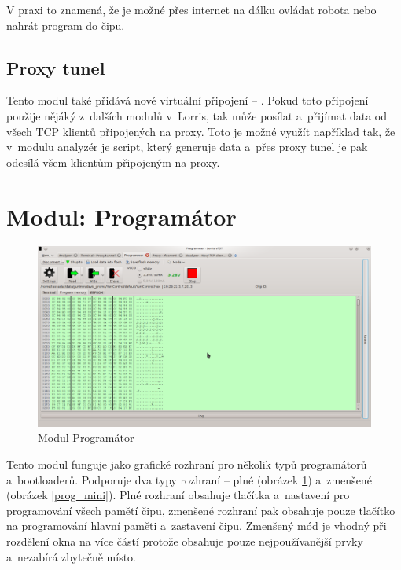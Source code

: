 \documentclass[12pt, a4paper, oneside]{article}
\begin{document}
V praxi to znamená, že je možné přes internet na dálku ovládat robota nebo nahrát program do čipu.

\subsection{Proxy tunel}
Tento modul také přidává nové virtuální připojení -- . Pokud toto připojení použije nějáký z~dalších modulů v~Lorris, tak může posílat a~přijímat data od všech TCP klientů připojených na proxy. Toto je možné využít například tak, že v~modulu analyzér je script, který generuje data a~přes proxy tunel je pak odesílá všem klientům připojeným na proxy.

\newpage
\setlength{\voffset}{0mm} %
\pagestyle{plain}

\section{Modul: Programátor}
\begin{figure}[H]
\begin{center}
\includegraphics[width=\textwidth]{img/programmer.png}
\caption{Modul Programátor}
\label{prog_full}
\end{center}
\end{figure}

Tento modul funguje jako grafické rozhraní pro několik typů programátorů a~bootloaderů. Podporuje dva typy rozhraní -- plné (obrázek \ref{prog_full}) a~zmenšené (obrázek \ref{prog_mini}). Plné rozhraní obsahuje tlačítka a~nastavení pro programování všech pamětí čipu, zmenšené rozhraní pak obsahuje pouze tlačítko na programování hlavní paměti a~zastavení čipu. Zmenšený mód je vhodný při rozdělení okna na více částí protože obsahuje pouze nejpoužívanější prvky a~nezabírá zbytečně místo.
\end{document}
